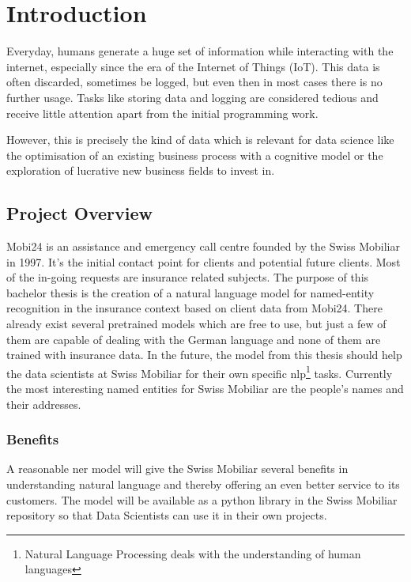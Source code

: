 \chapter{Introduction}

Everyday, humans generate a huge set of information while interacting with the internet, especially since the era of the
Internet of Things (IoT). This data is often discarded, sometimes be logged, but even then in most
cases there is no further usage. Tasks like storing data and logging are considered tedious and receive little attention
apart from the initial programming work.

However, this is precisely the kind of data which is relevant for data science like the optimisation of an existing
business process with a cognitive model or the exploration of lucrative new business fields to invest in.

\section{Project Overview}

Mobi24 is an assistance and emergency call centre founded by the Swiss Mobiliar in 1997. It's the initial contact point for
clients and potential future clients. Most of the in-going requests are insurance related subjects. The purpose of
this bachelor thesis is the creation of a natural language model for named-entity recognition in the insurance context
based on client data from Mobi24. There already exist several pretrained models which are free to use, but just a few of them are
capable of dealing with the German language and none of them are trained with insurance data. In the future, the model from this thesis
should help the data scientists at Swiss Mobiliar for their own specific \acrshort{nlp}\footnote{Natural Language Processing deals
with the understanding of human languages} tasks. Currently the most interesting named entities for Swiss Mobiliar are the
people's names and their addresses.

\subsection{Benefits}

A reasonable \acrshort{ner} model will give the Swiss Mobiliar several benefits in understanding natural language and thereby
offering an even better service to its customers. The model will be available as a python library in the Swiss Mobiliar
repository so that Data Scientists can use it in their own projects.

